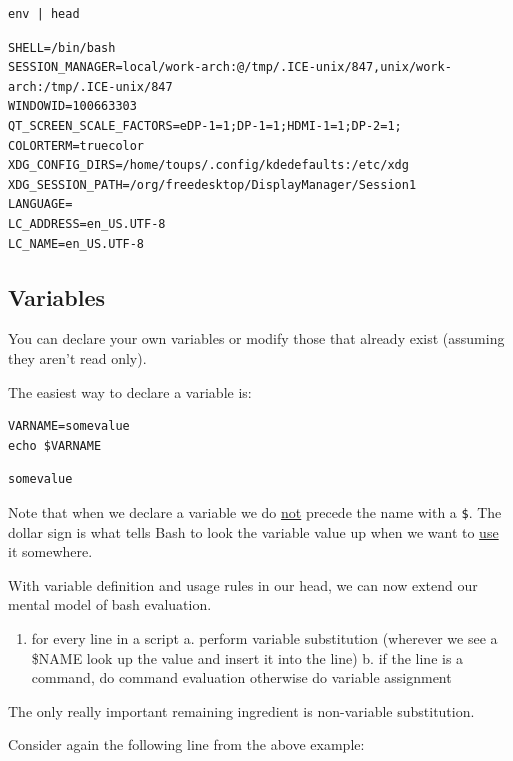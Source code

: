 \documentclass[11pt]{article}
\begin{document}
\begin{verbatim}
env | head
\end{verbatim}

\begin{verbatim}
SHELL=/bin/bash
SESSION_MANAGER=local/work-arch:@/tmp/.ICE-unix/847,unix/work-arch:/tmp/.ICE-unix/847
WINDOWID=100663303
QT_SCREEN_SCALE_FACTORS=eDP-1=1;DP-1=1;HDMI-1=1;DP-2=1;
COLORTERM=truecolor
XDG_CONFIG_DIRS=/home/toups/.config/kdedefaults:/etc/xdg
XDG_SESSION_PATH=/org/freedesktop/DisplayManager/Session1
LANGUAGE=
LC_ADDRESS=en_US.UTF-8
LC_NAME=en_US.UTF-8
\end{verbatim}

\subsection{Variables}
\label{sec:org2484487}

You can declare your own variables or modify those that already exist
(assuming they aren't read only).

The easiest way to declare a variable is:

\begin{verbatim}
VARNAME=somevalue
echo $VARNAME
\end{verbatim}

\begin{verbatim}
somevalue
\end{verbatim}

Note that when we declare a variable we do \uline{not} precede the name with
a \texttt{\$}. The dollar sign is what tells Bash to look the variable value
up when we want to \uline{use} it somewhere. 

With variable definition and usage rules in our head, we can now
extend our mental model of bash evaluation.

\begin{enumerate}
\item for every line in a script
a. perform variable substitution (wherever we see a \$NAME look up
the value and insert it into the line)
b. if the line is a command, do command evaluation
   otherwise do variable assignment
\end{enumerate}

The only really important remaining ingredient is non-variable
substitution.

Consider again the following line from the above example:
\end{document}

